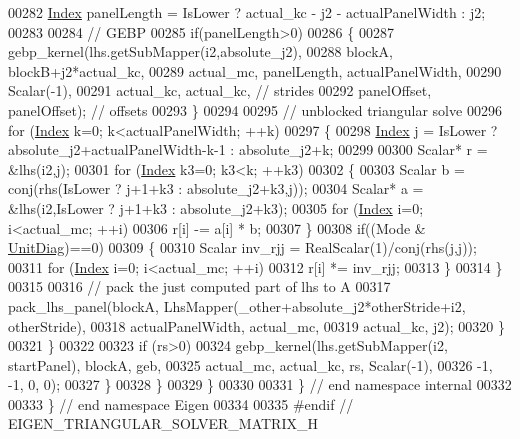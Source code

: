\begin{DoxyCode}
00282             \hyperlink{namespace_eigen_a62e77e0933482dafde8fe197d9a2cfde}{Index} panelLength = IsLower ? actual\_kc - j2 - actualPanelWidth : j2;
00283 
00284             \textcolor{comment}{// GEBP}
00285             \textcolor{keywordflow}{if}(panelLength>0)
00286             \{
00287               gebp\_kernel(lhs.getSubMapper(i2,absolute\_j2),
00288                           blockA, blockB+j2*actual\_kc,
00289                           actual\_mc, panelLength, actualPanelWidth,
00290                           Scalar(-1),
00291                           actual\_kc, actual\_kc, \textcolor{comment}{// strides}
00292                           panelOffset, panelOffset); \textcolor{comment}{// offsets}
00293             \}
00294 
00295             \textcolor{comment}{// unblocked triangular solve}
00296             \textcolor{keywordflow}{for} (\hyperlink{namespace_eigen_a62e77e0933482dafde8fe197d9a2cfde}{Index} k=0; k<actualPanelWidth; ++k)
00297             \{
00298               \hyperlink{namespace_eigen_a62e77e0933482dafde8fe197d9a2cfde}{Index} j = IsLower ? absolute\_j2+actualPanelWidth-k-1 : absolute\_j2+k;
00299 
00300               Scalar* r = &lhs(i2,j);
00301               \textcolor{keywordflow}{for} (\hyperlink{namespace_eigen_a62e77e0933482dafde8fe197d9a2cfde}{Index} k3=0; k3<k; ++k3)
00302               \{
00303                 Scalar b = conj(rhs(IsLower ? j+1+k3 : absolute\_j2+k3,j));
00304                 Scalar* a = &lhs(i2,IsLower ? j+1+k3 : absolute\_j2+k3);
00305                 \textcolor{keywordflow}{for} (\hyperlink{namespace_eigen_a62e77e0933482dafde8fe197d9a2cfde}{Index} i=0; i<actual\_mc; ++i)
00306                   r[i] -= a[i] * b;
00307               \}
00308               \textcolor{keywordflow}{if}((Mode & \hyperlink{group__enums_gga39e3366ff5554d731e7dc8bb642f83cdaddb72f888ac85d5a1c52333e54f9374b}{UnitDiag})==0)
00309               \{
00310                 Scalar inv\_rjj = RealScalar(1)/conj(rhs(j,j));
00311                 \textcolor{keywordflow}{for} (\hyperlink{namespace_eigen_a62e77e0933482dafde8fe197d9a2cfde}{Index} i=0; i<actual\_mc; ++i)
00312                   r[i] *= inv\_rjj;
00313               \}
00314             \}
00315 
00316             \textcolor{comment}{// pack the just computed part of lhs to A}
00317             pack\_lhs\_panel(blockA, LhsMapper(\_other+absolute\_j2*otherStride+i2, otherStride),
00318                            actualPanelWidth, actual\_mc,
00319                            actual\_kc, j2);
00320           \}
00321         \}
00322 
00323         \textcolor{keywordflow}{if} (rs>0)
00324           gebp\_kernel(lhs.getSubMapper(i2, startPanel), blockA, geb,
00325                       actual\_mc, actual\_kc, rs, Scalar(-1),
00326                       -1, -1, 0, 0);
00327       \}
00328     \}
00329   \}
00330 
00331 \} \textcolor{comment}{// end namespace internal}
00332 
00333 \} \textcolor{comment}{// end namespace Eigen}
00334 
00335 \textcolor{preprocessor}{#endif // EIGEN\_TRIANGULAR\_SOLVER\_MATRIX\_H}
\end{DoxyCode}

